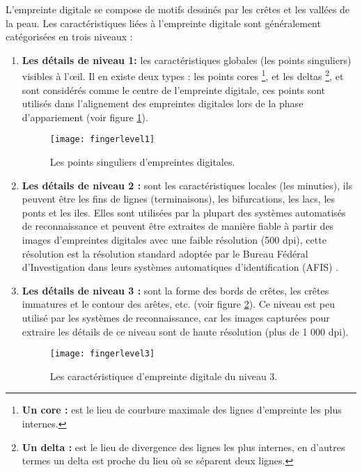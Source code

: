 L'empreinte digitale se compose de motifs dessinés par les crêtes et les vallées de la peau. Les caractéristiques liées à l'empreinte digitale sont généralement catégorisées en trois niveaux \citep{hasan2013fingerprint} :
\begin{enumerate}
	
	
	\item 	\textbf{Les détails de niveau 1: }les caractéristiques globales (les points singuliers) visibles à l'œil. Il en existe deux types : les points cores \footnote{\textbf{Un core :} est le lieu de courbure maximale des lignes d'empreinte les plus internes.}, et les deltas \footnote{\textbf{Un delta :} est le lieu de divergence des lignes les plus internes, en d'autres termes un delta est proche du lieu où se séparent deux lignes.}, et sont considérés comme le centre de l'empreinte digitale, ces points sont utilisés dans l'alignement des empreintes digitales lors de la phase d'appariement (voir figure \ref{fig:chapitre2fingerprintlevel1}). 
	
	
	\begin{center}
		\begin{figure}[H]
			\centering
			\texttt{[image: fingerlevel1]}
			\captionsetup{justification=centering}
			\caption{Les points singuliers d'empreintes digitales.}
			\label{fig:chapitre2fingerprintlevel1}
		\end{figure}
	\end{center}
	
	
	\item \textbf{Les détails de niveau 2 : }sont les caractéristiques locales (les minuties), ils peuvent être les fins de lignes (terminaisons), les bifurcations, les lacs, les ponts et les iles. Elles sont utilisées par la plupart des systèmes automatisés de reconnaissance et peuvent être extraites de manière fiable à partir des images d'empreintes digitales avec une faible résolution (500 dpi), cette résolution est la résolution standard adoptée par le Bureau Fédéral d'Investigation dans leurs systèmes automatiques d'identification (AFIS) \citep{jain2007pores}.
	
	
	\item \textbf{Les détails de niveau 3 :} sont la forme des bords de crêtes, les crêtes immatures et le contour des arêtes, etc. (voir figure \ref{fig:chapitre2fingerprintlevel3}). Ce niveau est peu utilisé par les systèmes de reconnaissance, car les images capturées pour extraire les détails de ce niveau sont de haute résolution (plus de 1 000 dpi). 
	
	\begin{center}
		\begin{figure}[H]
			\centering
			\texttt{[image: fingerlevel3]}
			\caption{Les caractéristiques d'empreinte digitale du niveau 3.}
			\label{fig:chapitre2fingerprintlevel3}
		\end{figure}
	\end{center}
\end{enumerate}
